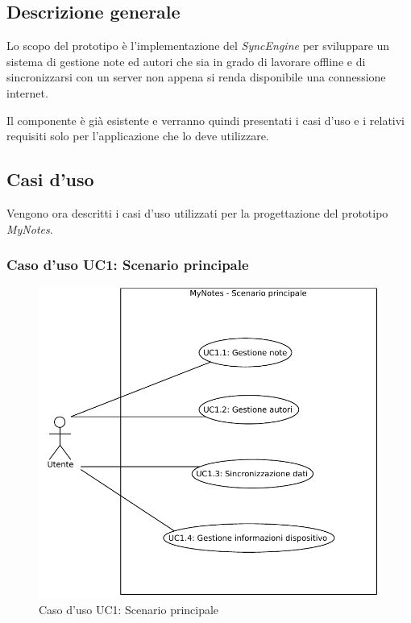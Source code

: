 \subsection{Descrizione generale}
Lo scopo del prototipo è  l'implementazione del \emph{SyncEngine} per sviluppare un sistema di gestione note ed autori che sia in grado di lavorare offline e di sincronizzarsi con un server non appena si renda disponibile una connessione internet.

Il componente è già esistente e verranno quindi presentati i casi d'uso e i relativi requisiti solo per l'applicazione che lo deve utilizzare.

\subsection{Casi d'uso}
Vengono ora descritti i casi d'uso utilizzati per la progettazione del prototipo \emph{MyNotes}.

\subsubsection{Caso d'uso UC1: Scenario principale}
\begin{figure}[htb]
\centering
\includegraphics[scale=0.6]{gfx/useCase/MN_UC1_Scenario_principale.pdf}
\caption{Caso d'uso UC1: Scenario principale}
\label{fig:My notes UC1}
\end{figure}

